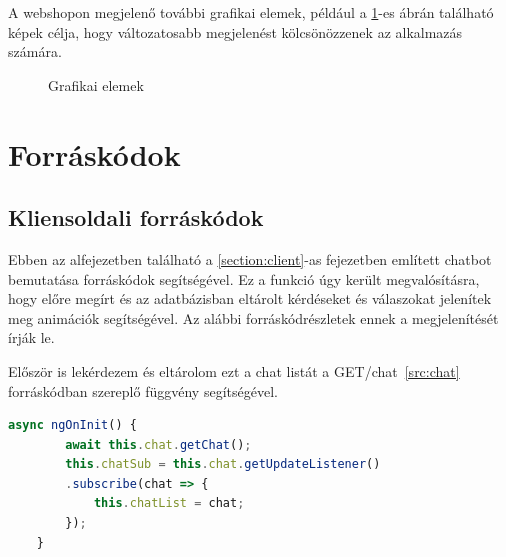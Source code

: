 A webshopon megjelenő további grafikai elemek, például a \ref{fig.picture-14}-es ábrán található képek célja, hogy változatosabb megjelenést kölcsönözzenek az alkalmazás számára.
\begin{figure}[H]
	\centering
	\hspace{5pt}
	\caption{Grafikai elemek}
	\label{fig.picture-14}
\end{figure}

\section{Forráskódok}
\label{section:sourcecode}

\subsection{Kliensoldali forráskódok}
\label{subsection:clientsource}
Ebben az alfejezetben található a \ref{section:client}-as fejezetben említett chatbot bemutatása forráskódok segítségével. Ez a funkció úgy került megvalósításra, hogy előre megírt és az adatbázisban eltárolt kérdéseket és válaszokat jelenítek meg animációk segítségével. Az alábbi forráskódrészletek ennek a megjelenítését írják le.

\bigskip
Először is lekérdezem és eltárolom ezt a chat listát a GET/chat~\ref{src:chat} forráskódban szereplő függvény segítségével.

\begin{lstlisting}[language=JavaScript]
	async ngOnInit() {
		await this.chat.getChat();
		this.chatSub = this.chat.getUpdateListener()
		.subscribe(chat => {
			this.chatList = chat;
		});
	}
\end{lstlisting}

